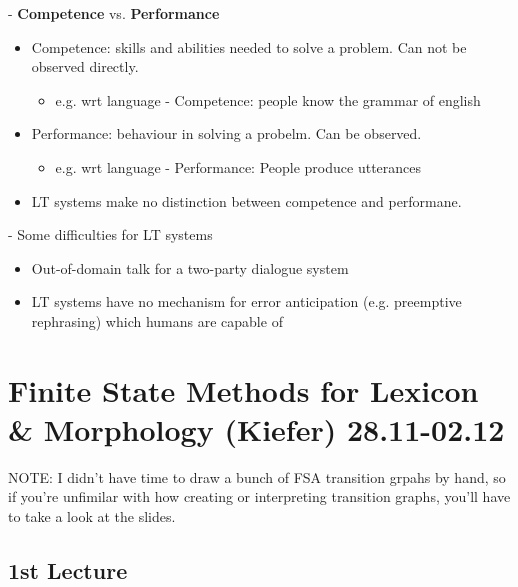 \documentclass[11pt]{article}
\begin{document}
- {\bf Competence} vs. {\bf Performance}
\begin{itemize}
 \item Competence: skills and abilities needed to solve a problem. Can not be observed directly.
\begin{itemize}
 \item e.g. wrt language - Competence: people know the grammar of english
\end{itemize}
 \item Performance: behaviour in solving a probelm. Can be observed.
\begin{itemize}
 \item e.g. wrt language - Performance: People produce utterances
\end{itemize}
 \item LT systems make no distinction between competence and performane.
\end{itemize}
- Some difficulties for LT systems
\begin{itemize}
 \item Out-of-domain talk for a two-party dialogue system
 \item LT systems have no mechanism for error anticipation (e.g. preemptive rephrasing) which humans are capable of
\end{itemize}

\section{Finite State Methods for Lexicon \& Morphology (Kiefer) 28.11-02.12}
NOTE: I didn't have time to draw a bunch of FSA transition grpahs by hand, so if you're unfimilar with how creating or interpreting transition graphs, you'll have to take a look at the slides.

\subsection{ 1st Lecture }
\end{document}
